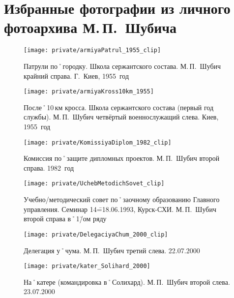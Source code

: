 ﻿\section[Фотографии из фотоархива М.\,П.~Шубича]{Избранные фотографии из личного фотоархива М.\,П.~Шубича}

\makeatletter
\setlength{\@fptop}{0pt}
\makeatother

\begin{figure}[H]
\texttt{[image: private/armiyaPatrul\_1955\_clip]}
\caption{Патрули по˚городку. Школа сержантского состава. М.\,П.~Шубич крайний справа. Г.~Киев, 1955~год}
\label{fig:armiyaPatrul_1955}
\end{figure}

\begin{figure}[h]
\texttt{[image: private/armiyaKross10km\_1955]}
\caption{После˚10\,км кросса. Школа сержантского состава (первый год службы). М.\,П.~Шубич четвёртый военнослужащий слева. Киев, 1955~год}
\label{fig:armiyaKross10km_1955}
\end{figure}

\begin{figure}[h]
\texttt{[image: private/KomissiyaDiplom\_1982\_clip]}
\caption{Комиссия по˚защите дипломных проектов. М.\,П.~Шубич второй справа. 1982~год}
\label{fig:KomissiyaDiplom_1982}
\end{figure}

\begin{figure}[h]
\texttt{[image: private/UchebMetodichSovet\_clip]}
\caption{Учебно\-/методический совет по˚заочному образованию Главного управления. Семинар 14\==18.06.1993, Курск-СХИ. М.\,П.~Шубич второй справа в˚1\=/ом ряду}
\label{fig:UchebMetodichSovet}
\end{figure}

\begin{figure}[h]
\texttt{[image: private/DelegaciyaChum\_2000\_clip]}
\caption{Делегация у˚чума. М.\,П.~Шубич третий слева. 22.07.2000}
\label{fig:DelegaciyaChum_2000}
\end{figure}

\begin{figure}[h]
\texttt{[image: private/kater\_Solihard\_2000]}
\caption{На˚катере (командировка в˚Солихард). М.\,П.~Шубич второй слева. 23.07.2000}
\label{fig:kater_Solihard_2000}
\end{figure}

